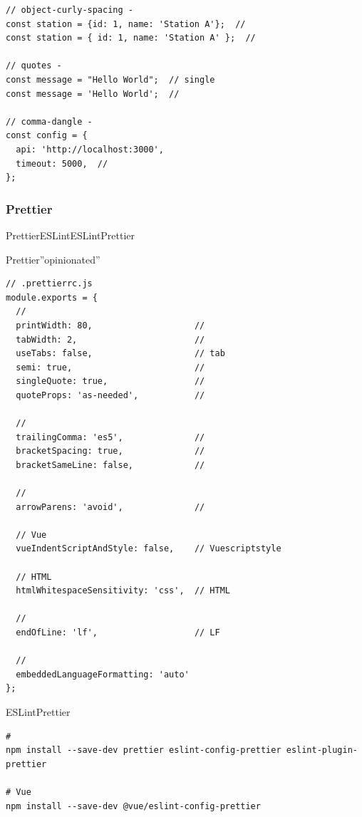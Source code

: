\important{}

\begin{lstlisting}[style=javascript]
// object-curly-spacing - 
const station = {id: 1, name: 'Station A'};  // 
const station = { id: 1, name: 'Station A' };  // 

// quotes - 
const message = "Hello World";  // single
const message = 'Hello World';  // 

// comma-dangle - 
const config = {
  api: 'http://localhost:3000',
  timeout: 5000,  // 
};
\end{lstlisting}

\hypertarget{prettier}{%
\subsubsection{Prettier}\label{prettier}}

PrettierESLintESLintPrettier


Prettier''opinionated''


\begin{lstlisting}[style=javascript]
// .prettierrc.js
module.exports = {
  // 
  printWidth: 80,                    // 
  tabWidth: 2,                       // 
  useTabs: false,                    // tab
  semi: true,                        // 
  singleQuote: true,                 // 
  quoteProps: 'as-needed',           // 
  
  // 
  trailingComma: 'es5',              // 
  bracketSpacing: true,              // 
  bracketSameLine: false,            // 
  
  // 
  arrowParens: 'avoid',              // 
  
  // Vue
  vueIndentScriptAndStyle: false,    // Vuescriptstyle
  
  // HTML
  htmlWhitespaceSensitivity: 'css',  // HTML
  
  // 
  endOfLine: 'lf',                   // LF
  
  // 
  embeddedLanguageFormatting: 'auto'
};
\end{lstlisting}


ESLintPrettier

\begin{lstlisting}[style=terminal]
# 
npm install --save-dev prettier eslint-config-prettier eslint-plugin-prettier

# Vue
npm install --save-dev @vue/eslint-config-prettier
\end{lstlisting}

